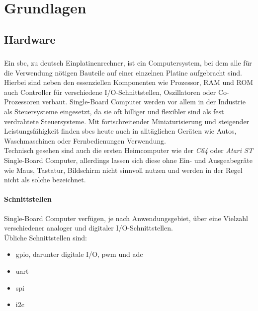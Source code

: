 \chapter{Grundlagen}

\section{Hardware}

\subsection{}
Ein \gls{sbc}, zu deutsch Einplatinenrechner, ist ein Computersystem, bei dem alle für die Verwendung nötigen Bauteile auf einer einzelnen Platine aufgebracht sind. Hierbei sind neben den essenziellen Komponenten wie Prozessor, RAM und ROM auch Controller für verschiedene I/O-Schnittstellen, Oszillatoren oder Co-Prozessoren verbaut. Single-Board Computer werden vor allem in der Industrie als Steuersysteme eingesetzt, da sie oft billiger und flexibler sind als fest verdrahtete Steuersysteme. Mit fortschreitender Miniaturisierung und steigender Leistungsfähigkeit finden \glspl{sbc} heute auch in alltäglichen Geräten wie Autos, Waschmaschinen oder Fernbedienungen Verwendung.\\

Technisch gesehen sind auch die ersten Heimcomputer wie der \emph{C64} oder \emph{Atari ST} Single-Board Computer, allerdings lassen sich diese ohne Ein- und Ausgeabegräte wie Maus, Tastatur, Bildschirm nicht sinnvoll nutzen und werden in der Regel nicht als solche bezeichnet.


\subsubsection{Schnittstellen}
Single-Board Computer verfügen, je nach Anwendungsgebiet, über eine Vielzahl verschiedener analoger und digitaler I/O-Schnittstellen.\\

\noindent Übliche Schnittstellen sind:

\begin{itemize}
\item \gls{gpio}, darunter digitale I/O, \gls{pwm} und \gls{adc}
\item \gls{uart}
\item \gls{spi}
\item \gls{i2c}
\end{itemize}

